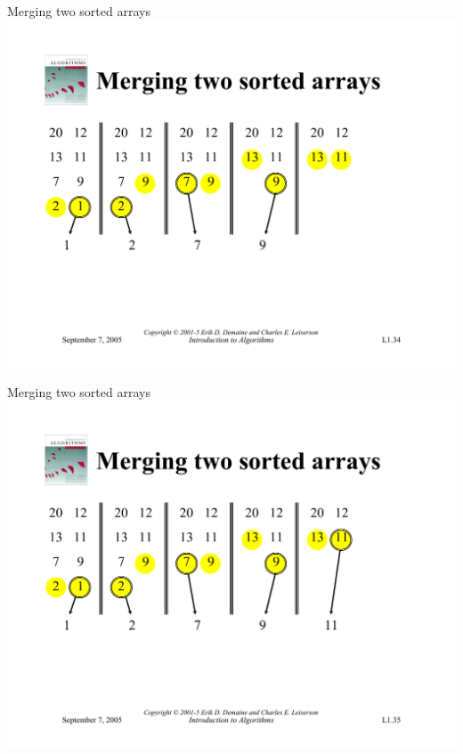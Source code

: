 \documentclass{beamer}
\begin{document}
\begin{frame}{Merging two sorted arrays}
    \centering
    \includegraphics[width=\textwidth, trim={1.1cm 6cm 1.1cm 4.95cm}, clip]{pages/lec1_34}
\end{frame}
\begin{frame}{Merging two sorted arrays}
    \centering
    \includegraphics[width=\textwidth, trim={1.1cm 6cm 1.1cm 4.95cm}, clip]{pages/lec1_35}
\end{frame}
\end{document}
